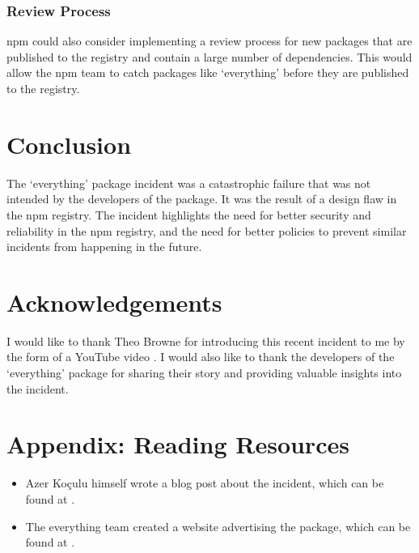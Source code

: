 \documentclass[acmsmall]{acmart}
\begin{document}
\subsubsection{Review Process}
npm could also consider implementing a review process for new packages that are
published to the registry and contain a large number of dependencies. This would
allow the npm team to catch packages like `everything' before they are published
to the registry.

\section{Conclusion}
The `everything' package incident was a catastrophic failure that was not
intended by the developers of the package. It was the result of a design flaw in
the npm registry. The incident highlights the need for better security and
reliability in the npm registry, and the need for better policies to prevent
similar incidents from happening in the future.

\section{Acknowledgements}
I would like to thank Theo Browne for introducing this recent incident to me
by the form of a YouTube video \cite{youtube-everything}. I would also like to
thank the developers of the `everything' package for sharing their story and
providing valuable insights into the incident.




\appendix
\section{Appendix: Reading Resources}
\begin{itemize}
  \item Azer Koçulu himself wrote a blog post about the incident, which can be found at \cite{appendix-medium-azer}.
  \item The everything team created a website advertising the package, which can be found at \cite{appendix-everything-website}.
\end{itemize}
\end{document}
